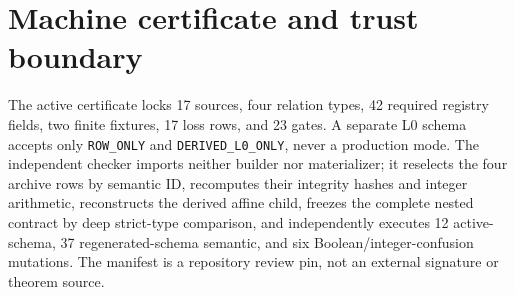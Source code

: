 \documentclass[11pt]{article}
\newcommand{\code}[1]{\nolinkurl{#1}}
\begin{document}
\section{Machine certificate and trust boundary}

The active certificate locks 17 sources, four relation types, 42 required
registry fields, two finite fixtures, 17 loss rows, and 23 gates.  A separate
L0 schema accepts only \code{ROW_ONLY} and
\code{DERIVED_L0_ONLY}, never a production mode.  The independent checker
imports neither builder nor materializer; it reselects the four archive rows
by semantic ID, recomputes their integrity hashes and integer arithmetic,
reconstructs the derived affine child, freezes the complete nested contract
by deep strict-type comparison, and independently executes 12 active-schema,
37 regenerated-schema semantic, and six Boolean/integer-confusion mutations.
The manifest is a repository review pin, not an external signature or theorem
source.

\begingroup
\small
\raggedright


\endgroup
\end{document}

